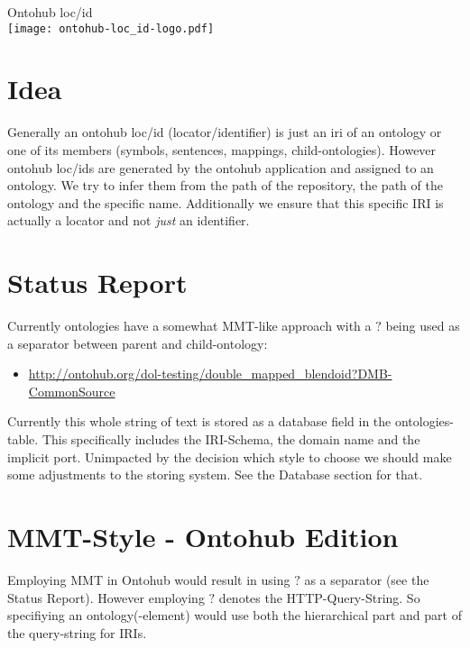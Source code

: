 \documentclass[a4paper,11pt,DIV=25]{scrartcl}
\author{Tim Reddehase}
\date{2014-09-09}
\begin{document}
\Huge
\begin{center}
  Ontohub loc/id\\
  \bigskip
  \texttt{[image: ontohub-loc\_id-logo.pdf]}
\end{center}
\normalsize

\bigskip

\section{Idea}

Generally an ontohub loc/id (locator/identifier) is just an iri of an ontology
or one of its members (symbols, sentences, mappings, child-ontologies). However
ontohub loc/ids are generated by the ontohub application and assigned to an
ontology.  We try to infer them from the path of the repository, the path of
the ontology and the specific name. Additionally we ensure that this specific
IRI is actually a locator and not \textit{just} an identifier.

\section{Status Report}

Currently ontologies have a somewhat MMT-like approach with a $?$ being used as
a separator between parent and child-ontology:

\begin{itemize}
  \item \url{http://ontohub.org/dol-testing/double_mapped_blendoid?DMB-CommonSource}
\end{itemize}

Currently this whole string of text is stored as a database field in the
ontologies-table.  This specifically includes the IRI-Schema, the domain name
and the implicit port. Unimpacted by the decision which style to choose we
should make some adjustments to the storing system. See the Database section
for that.

\pagebreak

\section{MMT-Style - Ontohub Edition}

Employing MMT in Ontohub would result in using $?$ as a separator (see the
Status Report).  However employing $?$ denotes the HTTP-Query-String. So
specifiying an ontology(-element) would use both the hierarchical part and part
of the query-string for IRIs.
\end{document}
